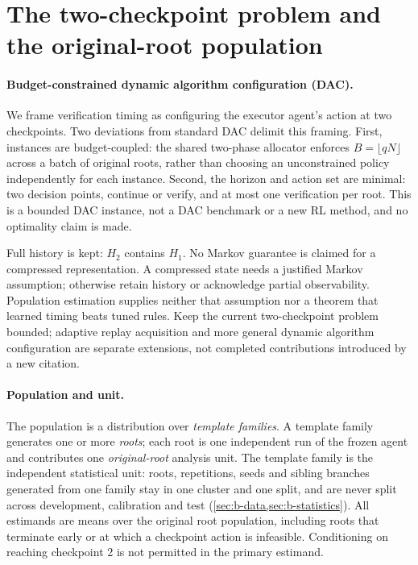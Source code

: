 \section{The two-checkpoint problem and the original-root population}
\label{sec:b-problem}

\paragraph{Budget-constrained dynamic algorithm configuration (DAC).}
We frame verification timing as configuring the executor agent's action at
two checkpoints. Two deviations from standard DAC delimit this framing.
First, instances are budget-coupled: the shared two-phase allocator enforces
$B=\lfloor qN\rfloor$ across a batch of original roots, rather than choosing
an unconstrained policy independently for each instance. Second, the horizon
and action set are minimal: two decision points, continue or verify, and at
most one verification per root. This is a bounded DAC instance, not a DAC
benchmark or a new RL method, and no optimality claim is made.

Full history is kept: $H_2$ contains $H_1$. No Markov guarantee is claimed
for a compressed representation. A compressed state needs a justified Markov
assumption; otherwise retain history or acknowledge partial observability.
Population estimation supplies neither that assumption nor a theorem that
learned timing beats tuned rules. Keep the current two-checkpoint problem
bounded; adaptive replay acquisition and more general dynamic algorithm
configuration are separate extensions, not completed contributions introduced
by a new citation.

\paragraph{Population and unit.}
The population is a distribution over \emph{template families}.  A template
family generates one or more \emph{roots}; each root is one independent run of
the frozen agent and contributes one \emph{original-root} analysis unit.  The
template family is the independent statistical unit: roots, repetitions, seeds
and sibling branches generated from one family stay in one cluster and one
split, and are never split across development, calibration and test
(\cref{sec:b-data,sec:b-statistics}).  All estimands are means over the original
root population, including roots that terminate early or at which a checkpoint
action is infeasible.  Conditioning on reaching checkpoint 2 is not permitted in
the primary estimand.

